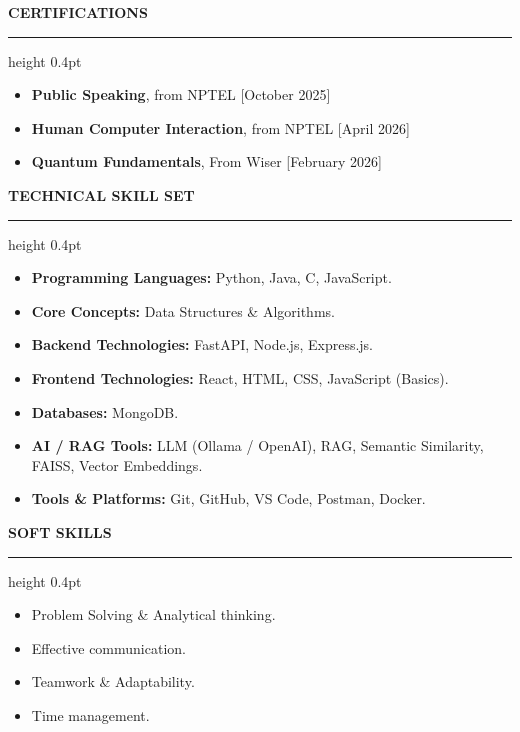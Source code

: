 \documentclass[a4paper,10pt]{article}
\newcommand{\resumesection}[1]{
    \vspace{6pt}
    {\large \bfseries \color{navy} \MakeUppercase{#1}}
    \vspace{2pt}
    \hrule height 0.4pt
    \vspace{4pt}
}
\begin{document}
\resumesection{Certifications}

\begin{itemize}
    \item \textbf{Public Speaking}, from NPTEL \hfill [October 2025]
    \item \textbf{Human Computer Interaction}, from NPTEL \hfill [April 2026]
    \item \textbf{Quantum Fundamentals}, From Wiser \hfill [February 2026]
\end{itemize}

\resumesection{Technical Skill Set}

\begin{itemize}
    \item \textbf{Programming Languages:} Python, Java, C, JavaScript.
    \item \textbf{Core Concepts:} Data Structures \& Algorithms.
    \item \textbf{Backend Technologies:} FastAPI, Node.js, Express.js.
    \item \textbf{Frontend Technologies:} React, HTML, CSS, JavaScript (Basics).
    \item \textbf{Databases:} MongoDB.
    \item \textbf{AI / RAG Tools:} LLM (Ollama / OpenAI), RAG, Semantic Similarity, FAISS, Vector Embeddings.
    \item \textbf{Tools \& Platforms:} Git, GitHub, VS Code, Postman, Docker.
\end{itemize}

\resumesection{Soft Skills}

\begin{itemize}
    \item Problem Solving \& Analytical thinking.
    \item Effective communication.
    \item Teamwork \& Adaptability.
    \item Time management.
\end{itemize}
\end{document}

